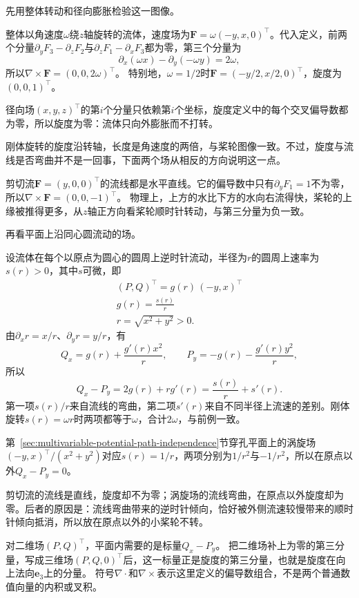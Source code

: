 先用整体转动和径向膨胀检验这一图像。
\begin{example}[刚体旋转与径向膨胀的旋度]
\label{ex:analysis-rigid-rotation-curl}
整体以角速度$\omega$绕$z$轴旋转的流体，速度场为$\bm F=\omega(-y,x,0)^\top$。代入定义，前两个分量$\partial_yF_3-\partial_zF_2$与$\partial_zF_1-\partial_xF_3$都为零，第三个分量为
\[
 \partial_x(\omega x)-\partial_y(-\omega y)=2\omega,
\]
所以$\nabla\times\bm F=(0,0,2\omega)^\top$。
特别地，$\omega=1/2$时$\bm F=(-y/2,x/2,0)^\top$，旋度为$(0,0,1)^\top$。

径向场$(x,y,z)^\top$的第$i$个分量只依赖第$i$个坐标，旋度定义中的每个交叉偏导数都为零，所以旋度为零：流体只向外膨胀而不打转。
\end{example}
刚体旋转的旋度沿转轴，长度是角速度的两倍，与桨轮图像一致。不过，旋度与流线是否弯曲并不是一回事，下面两个场从相反的方向说明这一点。
\begin{example}[剪切流与涡旋场]
剪切流$\bm F=(y,0,0)^\top$的流线都是水平直线。它的偏导数中只有$\partial_yF_1=1$不为零，所以$\nabla\times\bm F=(0,0,-1)^\top$。
物理上，上方的水比下方的水向右流得快，桨轮的上缘被推得更多，从$z$轴正方向看桨轮顺时针转动，与第三分量为负一致。

再看平面上沿同心圆流动的场。

设流体在每个以原点为圆心的圆周上逆时针流动，半径为$r$的圆周上速率为$s(r)>0$，其中$s$可微，即
\[
 \begin{gathered}
(P,Q)^\top=g(r)\,(-y,x)^\top\\
g(r)=\frac{s(r)}r\\
r=\sqrt{x^2+y^2}>0.
 \end{gathered}
\]
由$\partial_xr=x/r$、$\partial_yr=y/r$，有
\[
 Q_x=g(r)+\frac{g'(r)x^2}r,\qquad
 P_y=-g(r)-\frac{g'(r)y^2}r,
\]
所以
\[
 Q_x-P_y=2g(r)+rg'(r)=\frac{s(r)}r+s'(r).
\]
第一项$s(r)/r$来自流线的弯曲，第二项$s'(r)$来自不同半径上流速的差别。刚体旋转$s(r)=\omega r$时两项都等于$\omega$，合计$2\omega$，与前例一致。

第~\ref{sec:multivariable-potential-path-independence}节穿孔平面上的涡旋场$(-y,x)^\top/(x^2+y^2)$对应$s(r)=1/r$，两项分别为$1/r^2$与$-1/r^2$，所以在原点以外$Q_x-P_y=0$。
\end{example}
剪切流的流线是直线，旋度却不为零；涡旋场的流线弯曲，在原点以外旋度却为零。后者的原因是：流线弯曲带来的逆时针倾向，恰好被外侧流速较慢带来的顺时针倾向抵消，所以放在原点以外的小桨轮不转。

对二维场$(P,Q)^\top$，平面内需要的是标量$Q_x-P_y$。
把二维场补上为零的第三分量，写成三维场$(P,Q,0)^\top$后，这一标量正是旋度的第三分量，也就是旋度在向上法向$\bm e_3$上的分量。
符号$\nabla\mathbin\cdot$和$\nabla\times$表示这里定义的偏导数组合，不是两个普通数值向量的内积或叉积。

